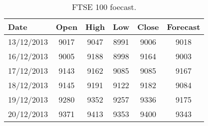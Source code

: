 \begin{table}[ht]
\centering
\caption[FTSE 100 foecast.]{FTSE 100 foecast.} 
\label{tab:chp_ts:ftse_100_fcast}
\begin{tabular}{lccccc}
  \toprule Date & Open & High & Low & Close & Forecast \\ 
  \midrule 13/12/2013 & 9017 & 9047 & 8991 & 9006 & 9018 \\ 
  16/12/2013 & 9005 & 9188 & 8998 & 9164 & 9003 \\ 
  17/12/2013 & 9143 & 9162 & 9085 & 9085 & 9167 \\ 
  18/12/2013 & 9145 & 9191 & 9122 & 9182 & 9084 \\ 
  19/12/2013 & 9280 & 9352 & 9257 & 9336 & 9175 \\ 
  20/12/2013 & 9371 & 9413 & 9353 & 9400 & 9343 \\ 
   \bottomrule \end{tabular}
\end{table}
